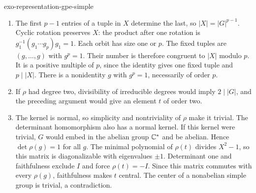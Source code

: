 \begin{correction}{exo-representation-gpe-simple}
\begin{enumerate}
\item The first $p-1$ entries of a tuple in $X$ determine the last,
so $|X|=|G|^{p-1}$. Cyclic rotation preserves $X$: the product after
one rotation is $g_1^{-1}(g_1\cdots g_p)g_1=1$. Each orbit has size
one or $p$. The fixed tuples are $(g,\ldots,g)$ with $g^p=1$.
Their number is therefore congruent to $|X|$ modulo $p$. It is a
positive multiple of $p$, since the identity gives one fixed tuple
and $p\mid|X|$. There is a nonidentity $g$ with $g^p=1$, necessarily
of order $p$.
\item If $\rho$ had degree two, divisibility of irreducible degrees
would imply $2\mid|G|$, and the preceding argument would give an
element $t$ of order two.
\item The kernel is normal, so simplicity and nontriviality of
$\rho$ make it trivial. The determinant homomorphism also has a
normal kernel. If this kernel were trivial, $G$ would embed in the
abelian group $\mathbb{C}^*$ and be abelian. Hence $\det\rho(g)=1$ for all
$g$. The minimal polynomial of $\rho(t)$ divides $X^2-1$, so this
matrix is diagonalizable with eigenvalues $\pm1$. Determinant one
and faithfulness exclude $I$ and force $\rho(t)=-I$. Since this
matrix commutes with every $\rho(g)$, faithfulness makes $t$ central.
The center of a nonabelian simple group is trivial, a contradiction.
\end{enumerate}
\end{correction}

